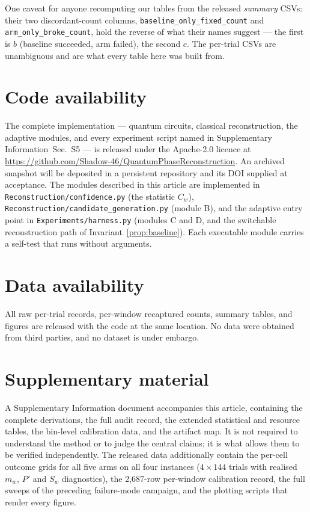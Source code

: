 \documentclass[preprint,11pt]{elsarticle}
\newcommand{\SI}{Supplementary Information}
\newcommand{\SIartifacts}{\SI{}~Sec.~S5}
\newcommand{\Cw}{C_w}
\begin{document}
One caveat for anyone recomputing our tables from the released
\emph{summary} CSVs: their two discordant-count columns,
\texttt{baseline\_only\_fixed\_count} and \texttt{arm\_only\_broke\_count},
hold the reverse of what their names suggest --- the first is $b$
(baseline succeeded, arm failed), the second $c$. The per-trial CSVs are
unambiguous and are what every table here was built from.

\section*{Code availability}
The complete implementation --- quantum circuits, classical
reconstruction, the adaptive modules, and every experiment script named
in \SIartifacts{} --- is released under the Apache-2.0 licence at
\url{https://github.com/Shadow-46/QuantumPhaseReconstruction}. An archived snapshot will be deposited in
a persistent repository and its DOI supplied at acceptance. The modules
described in this article are implemented in
\texttt{Reconstruction/\allowbreak{}confidence.py} (the statistic $\Cw$),
\texttt{Reconstruction/\allowbreak{}candidate\_\allowbreak{}generation.py} (module B),
and the adaptive entry point in \texttt{Experiments/\allowbreak{}harness.py}
(modules C and D, and the switchable reconstruction path of
Invariant~\ref{prop:baseline}). Each executable module carries a self-test
that runs without arguments.

\section*{Data availability}
All raw per-trial records, per-window recaptured counts, summary tables,
and figures are released with the code at the same location. No data were
obtained from third parties, and no dataset is under embargo.

\section*{Supplementary material}
A Supplementary Information document accompanies this article, containing
the complete derivations, the full audit record, the extended statistical
and resource tables, the bin-level calibration data, and the artifact
map. It is not required to understand the method or to judge the central
claims; it is what allows them to be verified independently. The released
data additionally contain the per-cell outcome grids for all five arms on
all four instances ($4\times144$ trials with realised $m_w$, $P'$ and
$S_w$ diagnostics), the 2{,}687-row per-window calibration record, the
full sweeps of the preceding failure-mode campaign, and the plotting
scripts that render every figure.



\end{document}

